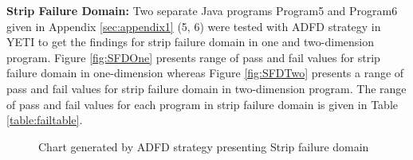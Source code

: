 \newpage
\noindent \textbf{Strip Failure Domain:} Two separate Java programs Program5 and Program6 given in Appendix \ref{sec:appendix1} (5, 6) were tested with ADFD strategy in YETI to get the findings for strip failure domain in one and two-dimension program. Figure \ref{fig:SFDOne} presents range of pass and fail values for strip failure domain in one-dimension whereas Figure \ref{fig:SFDTwo} presents a range of pass and fail values for strip failure domain in two-dimension program. The range of pass and fail values for each program in strip failure domain is given in Table \ref{table:failtable}.


%
\begin{figure} [H]
\centering
{}
\bigskip
{}
\bigskip
\caption{Chart generated by ADFD strategy presenting Strip failure domain}
\end{figure}






